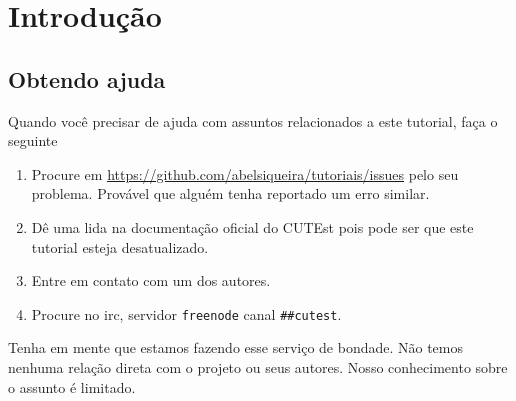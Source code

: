 \section{Introdução}
\subsection{Obtendo ajuda}
Quando você precisar de ajuda com assuntos relacionados a este tutorial, faça o seguinte
\begin{enumerate}
    \item Procure em \url{https://github.com/abelsiqueira/tutoriais/issues} pelo
        seu problema. Provável que alguém tenha reportado um erro similar.
    \item Dê uma lida na documentação oficial do CUTEst pois pode ser que este
        tutorial esteja desatualizado.
    \item Entre em contato com um dos autores.
    \item Procure no irc, servidor \verb+freenode+ canal \verb+##cutest+.
\end{enumerate}
Tenha em mente que estamos fazendo esse serviço de bondade. 
Não temos nenhuma relação direta com o projeto ou seus autores. 
Nosso conhecimento sobre o assunto é limitado.